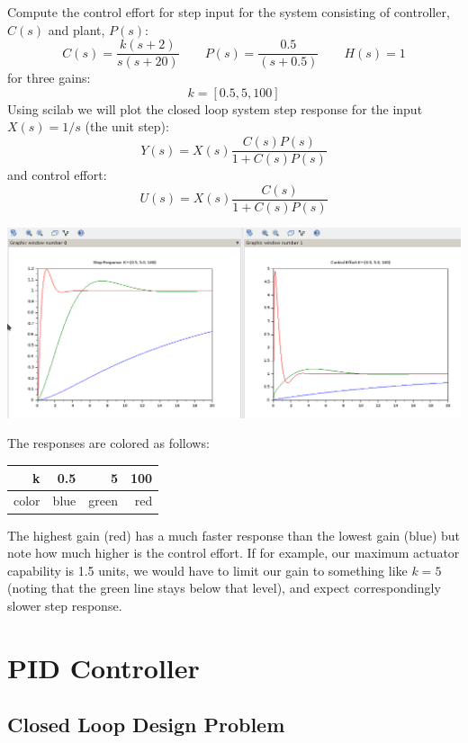 \begin{Example}
Compute the control effort for step input for the system consisting of controller, $C(s)$ and plant, $P(s)$:
\[
C(s) = \frac  {k(s+2)}  {s(s+20)}  \qquad P(s) = \frac   {0.5}  {(s+0.5)} \qquad H(s) = 1
\]
for three gains:
\[
k = [0.5, 5, 100]
\]
Using scilab we will plot the closed loop system step response for the input $X(s) = 1/s$ (the unit step):
\[
Y(s) = X(s) \frac  {C(s)P(s)}  {1+C(s)P(s)}
\]
and control effort:
\[
U(s) = X(s)\frac {C(s)}  {1+C(s)P(s)}
\]

\begin{centering}
\includegraphics[width=6.25in]{figs09/step_ctl_effort_scilab.png}
\end{centering}

The responses are colored as follows: 
\begin{tabular}{r|r|r|r}
k     &  0.5 & 5   & 100 \\
\hline
color & blue & green & red \\
\end{tabular}

The highest gain (red) has a much faster response than the lowest gain (blue) but note how much higher is the 
control effort.   If for example, our maximum actuator capability is 1.5 units, we would have to limit our gain to 
something like $k=5$ (noting that the green line stays below that level), and expect correspondingly slower step response.
\end{Example}




\section{PID Controller}
\subsection{Closed Loop Design Problem}

